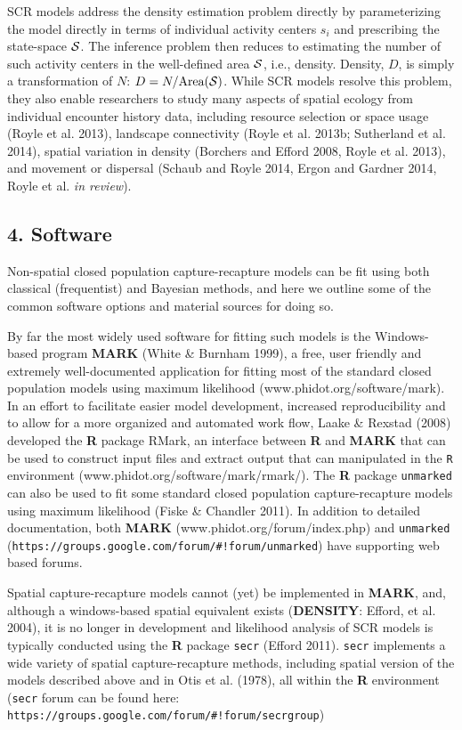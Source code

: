 \documentclass{book}
\begin{document}
SCR models address the density estimation problem directly by parameterizing
the model directly in terms of individual activity centers $s_i$ and
prescribing the state-space ${\cal S}$. The inference problem then
reduces to estimating the number of such activity centers in the
well-defined area ${\cal S}$, i.e., density.  Density, $D$, is simply a
transformation of $N$:  $D =  N/\mbox{Area}({\cal S})$.
While SCR models resolve
this problem, they also enable researchers to study many aspects of
spatial ecology from individual encounter history data, including
resource selection or space usage (Royle et al. 2013), landscape
connectivity (Royle et al. 2013b; Sutherland et al. 2014), spatial
variation in density (Borchers and Efford 2008, Royle et al. 2013),
and movement or dispersal (Schaub and Royle 2014, Ergon and Gardner
2014, Royle et al. {\it in review}).

\subsection*{4. Software}

Non-spatial closed population capture-recapture models can be fit using both classical (frequentist) and Bayesian methods, and here we outline some of the common software
options and material sources for doing so.

By far the most widely used software for fitting such models is the Windows-based program {\bf MARK} (White \& Burnham 1999), a free, user friendly and extremely well-documented application for fitting most of the standard closed population models using maximum likelihood (www.phidot.org/software/mark). In an effort to facilitate easier model development, increased reproducibility and to allow for a more organized and automated work flow, Laake \& Rexstad (2008) developed the {\bf R} package {RMark}, an interface between {\bf R} and {\bf MARK} that can be used to construct input files and extract output that can manipulated in the {\tt R} environment (www.phidot.org/software/mark/rmark/). The {\bf R} package {\tt unmarked} can also be used to fit some standard closed population capture-recapture models using maximum likelihood (Fiske \& Chandler 2011). In addition to detailed documentation, both {\bf MARK} (www.phidot.org/forum/index.php) and {\tt unmarked} (\verb|https://groups.google.com/forum/#!forum/unmarked|) have supporting web based forums.

Spatial capture-recapture models cannot (yet) be implemented in {\bf MARK}, and, although a windows-based spatial equivalent exists ({\bf DENSITY}: Efford, et al. 2004), it is no longer in development and likelihood analysis of SCR models is typically conducted using the {\bf R} package {\tt secr} (Efford 2011). {\tt secr} implements a wide variety of spatial capture-recapture methods, including spatial version of the models described above and in Otis et al. (1978), all within the {\bf R} environment ({\tt secr} forum can be found here: \verb|https://groups.google.com/forum/#!forum/secrgroup|)
\end{document}
